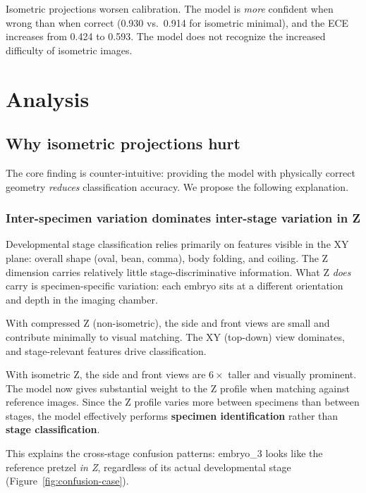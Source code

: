 \documentclass[11pt, a4paper]{article}
\begin{document}
Isometric projections worsen calibration.  The model is \emph{more} confident
when wrong than when correct (0.930 vs.\ 0.914 for isometric minimal), and
the ECE increases from 0.424 to 0.593.  The model does not recognize the
increased difficulty of isometric images.

\section{Analysis}

\subsection{Why isometric projections hurt}

The core finding is counter-intuitive: providing the model with physically
correct geometry \emph{reduces} classification accuracy.  We propose the
following explanation.

\subsubsection{Inter-specimen variation dominates inter-stage variation in Z}

Developmental stage classification relies primarily on features visible in the
XY plane: overall shape (oval, bean, comma), body folding, and coiling.  The Z
dimension carries relatively little stage-discriminative information.  What Z
\emph{does} carry is specimen-specific variation: each embryo sits at a
different orientation and depth in the imaging chamber.

With compressed Z (non-isometric), the side and front views are small and
contribute minimally to visual matching.  The XY (top-down) view dominates,
and stage-relevant features drive classification.

With isometric Z, the side and front views are $6\times$ taller and visually
prominent.  The model now gives substantial weight to the Z profile when
matching against reference images.  Since the Z profile varies more between
specimens than between stages, the model effectively performs
\textbf{specimen identification} rather than \textbf{stage classification}.

This explains the cross-stage confusion patterns: embryo\_3 looks like the
reference pretzel \emph{in Z}, regardless of its actual developmental stage
(Figure~\ref{fig:confusion-case}).
\end{document}
